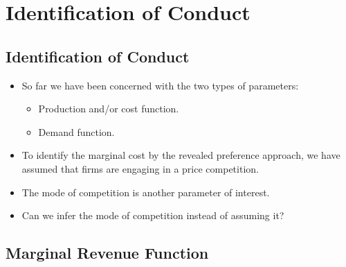 \documentclass[
]{book}
\providecommand{\tightlist}{%
  \setlength{\itemsep}{0pt}\setlength{\parskip}{0pt}}
\begin{document}
\hypertarget{identification-of-conduct}{%
\section{Identification of Conduct}\label{identification-of-conduct}}

\hypertarget{identification-of-conduct-1}{%
\subsection{Identification of Conduct}\label{identification-of-conduct-1}}

\begin{itemize}
\tightlist
\item
  So far we have been concerned with the two types of parameters:

  \begin{itemize}
  \tightlist
  \item
    Production and/or cost function.
  \item
    Demand function.
  \end{itemize}
\item
  To identify the marginal cost by the revealed preference approach, we have assumed that firms are engaging in a price competition.
\item
  The mode of competition is another parameter of interest.
\item
  Can we infer the mode of competition instead of assuming it?
\end{itemize}

\hypertarget{marginal-revenue-function}{%
\subsection{Marginal Revenue Function}\label{marginal-revenue-function}}
\end{document}
